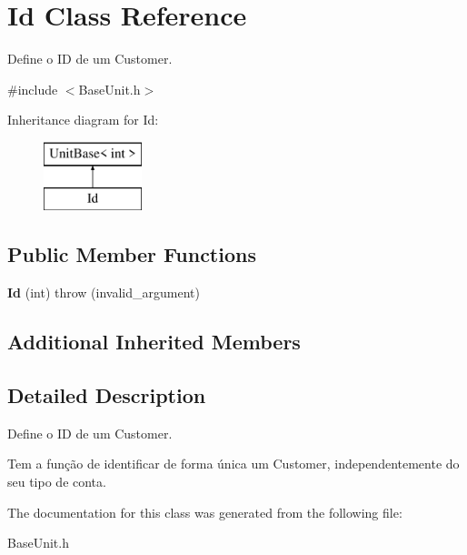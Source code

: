 \hypertarget{classId}{\section{Id Class Reference}
\label{classId}
}


Define o I\-D de um Customer.  




{\ttfamily \#include $<$Base\-Unit.\-h$>$}

Inheritance diagram for Id\-:\begin{figure}[H]
\begin{center}
\leavevmode
\includegraphics[height=2.000000cm]{classId}
\end{center}
\end{figure}
\subsection*{Public Member Functions}
\begin{DoxyCompactItemize}
\item 
\hypertarget{classId_afbb89dfd923bcd8415a48f726640082c}{{\bfseries Id} (int)  throw (invalid\-\_\-argument)}\label{classId_afbb89dfd923bcd8415a48f726640082c}

\end{DoxyCompactItemize}
\subsection*{Additional Inherited Members}


\subsection{Detailed Description}
Define o I\-D de um Customer. 

Tem a função de identificar de forma única um Customer, independentemente do seu tipo de conta. 

The documentation for this class was generated from the following file\-:\begin{DoxyCompactItemize}
\item 
Base\-Unit.\-h\end{DoxyCompactItemize}
